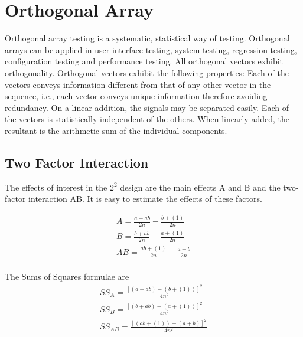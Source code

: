 
\section{Orthogonal Array}
Orthogonal array testing is a systematic, statistical way of testing. Orthogonal arrays can be applied in user interface testing, system testing, regression testing, configuration testing and performance testing.
All orthogonal vectors exhibit orthogonality. Orthogonal vectors exhibit the following properties:
Each of the vectors conveys information different from that of any other vector in the sequence, i.e., each vector conveys unique information therefore avoiding redundancy.
On a linear addition, the signals may be separated easily.
Each of the vectors is statistically independent of the others.
When linearly added, the resultant is the arithmetic sum of the individual components.


\subsection{Two Factor Interaction}
The effects of interest in the $2^2$ design are the  main effects A and B and the two-factor interaction AB. It is easy to estimate the effects of these factors.

\begin{eqnarray}
A = \frac{a+ab}{2n} -  \frac{b + (1)}{2n}\\
B = \frac{b+ab}{2n} -  \frac{a + (1)}{2n}\\
AB = \frac{ab + (1)}{2n} -  \frac{a + b}{2n}\\
\end{eqnarray}

The Sums of Squares formulae are
\begin{eqnarray}
SS_{A} = \frac{[(a + ab)-(b + (1))]^2}{4n^2}\\
SS_{B} = \frac{[(b + ab)-(a + (1))]^2}{4n^2}\\
SS_{AB} = \frac{[(ab + (1))-(a + b)]^2}{4n^2}\\
\end{eqnarray}


